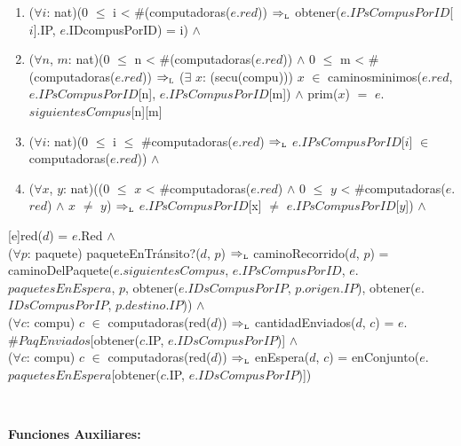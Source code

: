 \begin{Representacion}
{\begin{enumerate}
\item	($\forall i$: nat)(0 $\leq$ i < \#(computadoras($e$.$red$)) $\Rightarrow_{\mathrm{\scriptscriptstyle{L}}}$ obtener($e$.$IPsCompusPorID$[$i$].IP, $e$.IDcompusPorID) = i) $\land$ 

\item	($\forall n$, $m$: nat)(0 $\leq$ n < \#(computadoras($e$.$red$)) $\land$ 0 $\leq$ m < \#(computadoras($e$.$red$)) $\Rightarrow_{\mathrm{\scriptscriptstyle{L}}}$ ($\exists$ $x$: (secu(compu))) $x$ $\in$ caminosminimos($e$.$red$, $e$.$IPsCompusPorID$[n], $e$.$IPsCompusPorID$[m]) $\land$ prim($x$) $=$ $e$.$siguientesCompus$[n][m] 

\item    ($\forall i$: nat)(0 $\leq$ i $\leq$ \#computadoras($e$.$red$) $\Rightarrow_{\mathrm{\scriptscriptstyle{L}}}$ $e$.$IPsCompusPorID$[$i$] $\in$ computadoras($e$.$red$)) $\land$ 

\item    ($\forall x$, $y$: nat)((0 $\leq$ $x$ < \#computadoras($e$.$red$) $\land$ 0 $\leq$ $y$ < \#computadoras($e$.$red$) $\land$ $x$ $\neq$ $y$) $\Rightarrow_{\mathrm{\scriptscriptstyle{L}}}$ $e$.$IPsCompusPorID$[x] $\neq$ $e$.$IPsCompusPorID$[$y$]) $\land$ 


    \end{enumerate} 
    
    }\mbox{} %

\pagebreak

[e]{red($d$) = $e$.Red $\land$ \\

  ($\forall p$: paquete) paqueteEnTr\'ansito?($d$, $p$) $\Rightarrow_{\mathrm{\scriptscriptstyle{L}}}$ caminoRecorrido($d$, $p$) = caminoDelPaquete($e$.$siguientesCompus$, $e$.$IPsCompusPorID$, $e$.$paquetesEnEspera$, $p$, obtener($e$.$IDsCompusPorIP$, $p$.$origen$.$IP$), obtener($e$.$IDsCompusPorIP$, $p$.$destino$.$IP$)) $\land$ \\

  ($\forall c$: compu) $c$ $\in$ computadoras(red($d$)) $\Rightarrow_{\mathrm{\scriptscriptstyle{L}}}$ cantidadEnviados($d$, $c$) = $e$.$\#PaqEnviados$[obtener($c$.IP, $e$.$IDsCompusPorIP$)] $\land$ \\

  ($\forall c$: compu) $c$ $\in$ computadoras(red($d$)) $\Rightarrow_{\mathrm{\scriptscriptstyle{L}}}$ enEspera($d$, $c$) = enConjunto($e$.$paquetesEnEspera$[obtener($c$.IP, $e$.$IDsCompusPorIP$)])
}

  ~

  \textbf{Funciones Auxiliares:}

  ~




\end{Representacion}

